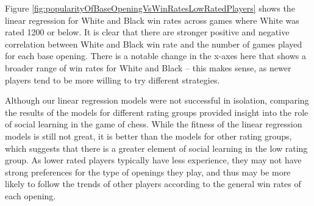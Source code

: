 \documentclass[a4paper, 11pt]{article}
\begin{document}
Figure \ref{fig:popularityOfBaseOpeningVsWinRatesLowRatedPlayers} shows the linear regression for White and Black win rates across games where White was rated 1200 or below. It is clear that there are stronger positive and negative correlation between White and Black win rate and the number of games played for each base opening. There is a notable change in the x-axes here that shows a broader range of win rates for White and Black -- this makes sense, as newer players tend to be more willing to try different strategies.

Although our linear regression models were not successful in isolation, comparing the results of the models for different rating groups provided insight into the role of social learning in the game of chess. While the fitness of the linear regression models is still not great, it is better than the models for other rating groups, which suggests that there is a greater element of social learning in the low rating group. As lower rated players typically have less experience, they may not have strong preferences for the type of openings they play, and thus may be more likely to follow the trends of other players according to the general win rates of each opening.
\end{document}
